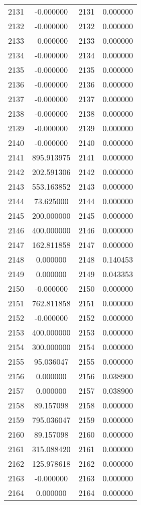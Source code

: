 \documentclass[12pt]{article}
\begin{document}
\begin{longtable}{@{}cccc@{}}
2131 & -0.000000 & 2131 & 0.000000 \\
2132 & -0.000000 & 2132 & 0.000000 \\
2133 & -0.000000 & 2133 & 0.000000 \\
2134 & -0.000000 & 2134 & 0.000000 \\
2135 & -0.000000 & 2135 & 0.000000 \\
2136 & -0.000000 & 2136 & 0.000000 \\
2137 & -0.000000 & 2137 & 0.000000 \\
2138 & -0.000000 & 2138 & 0.000000 \\
2139 & -0.000000 & 2139 & 0.000000 \\
2140 & -0.000000 & 2140 & 0.000000 \\
2141 & 895.913975 & 2141 & 0.000000 \\
2142 & 202.591306 & 2142 & 0.000000 \\
2143 & 553.163852 & 2143 & 0.000000 \\
2144 & 73.625000 & 2144 & 0.000000 \\
2145 & 200.000000 & 2145 & 0.000000 \\
2146 & 400.000000 & 2146 & 0.000000 \\
2147 & 162.811858 & 2147 & 0.000000 \\
2148 & 0.000000 & 2148 & 0.140453 \\
2149 & 0.000000 & 2149 & 0.043353 \\
2150 & -0.000000 & 2150 & 0.000000 \\
2151 & 762.811858 & 2151 & 0.000000 \\
2152 & -0.000000 & 2152 & 0.000000 \\
2153 & 400.000000 & 2153 & 0.000000 \\
2154 & 300.000000 & 2154 & 0.000000 \\
2155 & 95.036047 & 2155 & 0.000000 \\
2156 & 0.000000 & 2156 & 0.038900 \\
2157 & 0.000000 & 2157 & 0.038900 \\
2158 & 89.157098 & 2158 & 0.000000 \\
2159 & 795.036047 & 2159 & 0.000000 \\
2160 & 89.157098 & 2160 & 0.000000 \\
2161 & 315.088420 & 2161 & 0.000000 \\
2162 & 125.978618 & 2162 & 0.000000 \\
2163 & -0.000000 & 2163 & 0.000000 \\
2164 & 0.000000 & 2164 & 0.000000 \\

\end{longtable}
\end{document}
